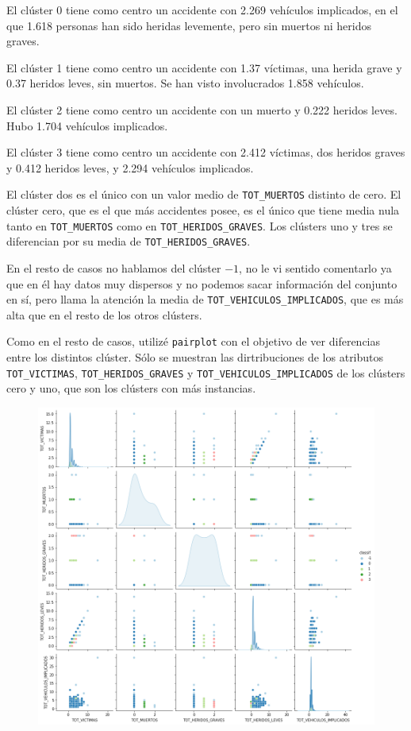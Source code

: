 \documentclass[a4]{article}
\begin{document}
El clúster 0 tiene como centro un accidente con 2.269 vehículos implicados, en el que 1.618 personas han sido heridas levemente, pero sin muertos ni heridos graves.

El clúster 1 tiene como centro un accidente con 1.37 víctimas, una herida grave y 0.37 heridos leves, sin muertos. Se han visto involucrados 1.858 vehículos.

El clúster 2 tiene como centro un accidente con un muerto y 0.222 heridos leves. Hubo 1.704 vehículos implicados.

El clúster 3 tiene como centro un accidente con 2.412 víctimas, dos heridos graves y 0.412 heridos leves, y 2.294 vehículos implicados.

El clúster dos es el único con un valor medio de \texttt{TOT\_MUERTOS} distinto de cero. El clúster cero, que es el que más accidentes posee, es el único que tiene media nula tanto en \texttt{TOT\_MUERTOS} como en \texttt{TOT\_HERIDOS\_GRAVES}. Los clústers uno y tres se diferencian por su media de \texttt{TOT\_HERIDOS\_GRAVES}.

En el resto de casos no hablamos del clúster $-1$, no le vi sentido comentarlo ya que en él hay datos muy dispersos y no podemos sacar información del conjunto en sí, pero llama la atención la media de \texttt{TOT\_VEHICULOS\_IMPLICADOS}, que es más alta que en el resto de los otros clústers.

Como en el resto de casos, utilizé \texttt{pairplot} con el objetivo de ver diferencias entre los distintos clúster. Sólo se muestran las dirtribuciones de los atributos \texttt{TOT\_VICTIMAS}, \texttt{TOT\_HERIDOS\_GRAVES} y \texttt{TOT\_VEHICULOS\_IMPLICADOS} de los clústers cero y uno, que son los clústers con más instancias.

\begin{figure}[H]
  \centering
  \includegraphics[width=170mm]{imagenes/c3_dbscan_pairplot}
\end{figure}
\end{document}
